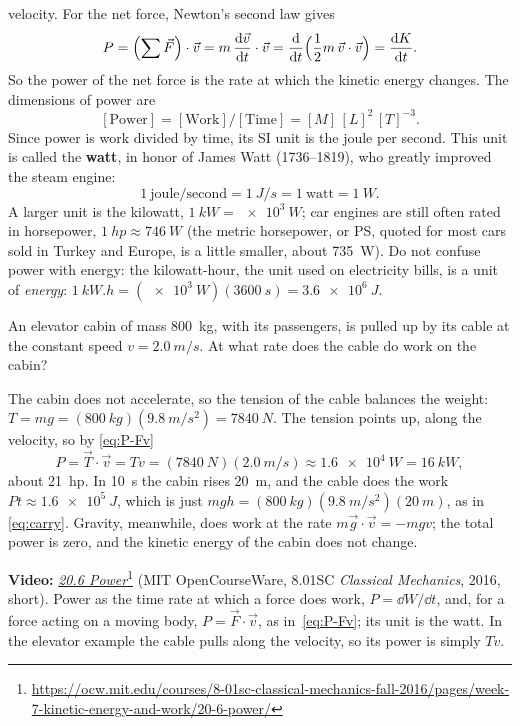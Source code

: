 \documentclass[11pt,a4paper]{article}
\begin{document}
velocity. For the net force, Newton's second law gives
\[
  P = \Bigl(\sum\vec{F}\Bigr)\cdot\vec{v} = m\,\frac{\mathrm{d} \vec{v}}{\mathrm{d} t}\cdot\vec{v}
    = \frac{\mathrm{d}}{\mathrm{d} t}\Bigl(\frac12 m\,\vec{v}\cdot\vec{v}\Bigr) = \frac{\mathrm{d} K}{\mathrm{d} t} .
\]
So the power of the net force is the rate at which the kinetic energy changes. The dimensions of
power are
\begin{equation}\label{eq:P-dim}
  [\text{Power}] = [\text{Work}]/[\text{Time}] = [M]\,[L]^2\,[T]^{-3} .
\end{equation}
Since power is work divided by time, its SI unit is the joule per second. This unit is called the
\textbf{watt}, in honor of James Watt (1736--1819), who greatly improved the steam engine:
\begin{equation}\label{eq:watt}
  1~\text{joule/second} = \qty{1}{J/s} = 1~\text{watt} = \qty{1}{W} .
\end{equation}
A larger unit is the kilowatt, $\qty{1}{kW} = \qty{e3}{W}$; car engines are still often rated in
horsepower, $\qty{1}{hp} \approx \qty{746}{W}$ (the metric horsepower, or PS, quoted for most cars
sold in Turkey and Europe, is a little smaller, about \qty{735}{W}). Do not confuse power with
energy: the kilowatt-hour, the unit used on electricity bills, is a unit of \emph{energy}: $\qty[inter-unit-product=\ensuremath{{}\cdot{}}]{1}{kW.h} = (\qty{e3}{W})(\qty{3600}{s}) = \qty{3.6e6}{J}$.

\begin{example}
\setlength{\parskip}{0.5em plus 0.1em}%
An elevator cabin of mass \qty{800}{kg}, with its passengers, is pulled up by its cable at the
constant speed $v = \qty{2.0}{m/s}$. At what rate does the cable do work on the cabin?

The cabin does not accelerate, so the tension of the cable balances the weight:
$T = mg = (\qty{800}{kg})(\qty{9.8}{m/s^2}) = \qty{7840}{N}$. The tension points up, along the
velocity, so by \eqref{eq:P-Fv}
\[
  P = \vec{T}\cdot\vec{v} = Tv = (\qty{7840}{N})(\qty{2.0}{m/s}) \approx \qty{1.6e4}{W} = \qty{16}{kW} ,
\]
about \qty{21}{hp}. In \qty{10}{s} the cabin rises \qty{20}{m}, and the cable does the work
$Pt \approx \qty{1.6e5}{J}$, which is just $mgh = (\qty{800}{kg})(\qty{9.8}{m/s^2})(\qty{20}{m})$,
as in \eqref{eq:carry}. Gravity, meanwhile, does work at the rate $m\vec{g}\cdot\vec{v} = -mgv$; the
total power is zero, and the kinetic energy of the cabin does not change.
\end{example}

\begin{aside}
\textbf{Video:}
\href{https://ocw.mit.edu/courses/8-01sc-classical-mechanics-fall-2016/pages/week-7-kinetic-energy-and-work/20-6-power/}{\emph{20.6
Power}}\footnote{\url{https://ocw.mit.edu/courses/8-01sc-classical-mechanics-fall-2016/pages/week-7-kinetic-energy-and-work/20-6-power/}}
(MIT OpenCourseWare, 8.01SC \emph{Classical Mechanics}, 2016, short). Power as the time rate at
which a force does work, $P = \dd W/\dd t$, and, for a force acting on a moving body,
$P = \vec{F}\cdot\vec{v}$, as in~\eqref{eq:P-Fv}; its unit is the watt. In the elevator example the
cable pulls along the velocity, so its power is simply $Tv$.
\end{aside}
\end{document}
